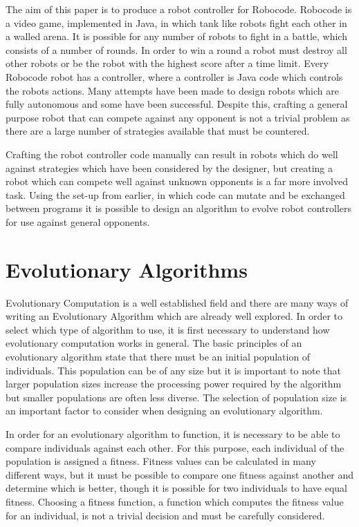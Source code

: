 \documentclass[a4paper, 12pt]{article}
\begin{document}
The aim of this paper is to produce a robot controller for Robocode. Robocode is a video game, implemented in Java, in which tank like robots fight each other in a walled arena. It is possible for any number of robots to fight in a battle, which consists of a number of rounds. In order to win a round a robot must destroy all other robots or be the robot with the highest score after a time limit. Every Robocode robot has a controller, where a controller is Java code which controls the robots actions. Many attempts have been made to design robots which are fully autonomous and some have been successful. Despite this, crafting a general purpose robot that can compete against any opponent is not a trivial problem as there are a large number of strategies available that must be countered.

Crafting the robot controller code manually can result in robots which do well against strategies which have been considered by the designer, but creating a robot which can compete well against unknown opponents is a far more involved task. Using the set-up from earlier, in which code can mutate and be exchanged between programs it is possible to design an algorithm to evolve robot controllers for use against general opponents. 

\section{Evolutionary Algorithms}

Evolutionary Computation is a well established field and there are many ways of writing an Evolutionary Algorithm which are already well explored. In order to select which type of algorithm to use, it is first necessary to understand how evolutionary computation works in general. The basic principles of an evolutionary algorithm state that there must be an initial population of individuals. This population can be of any size but it is important to note that larger population sizes increase the processing power required by the algorithm but smaller populations are often less diverse. The selection of population size is an important factor to consider when designing an evolutionary algorithm. 

In order for an evolutionary algorithm to function, it is necessary to be able to compare individuals against each other. For this purpose, each individual of the population is assigned a fitness. Fitness values can be calculated in many different ways, but it must be possible to compare one fitness against another and determine which is better, though it is possible for two individuals to have equal fitness. Choosing a fitness function, a function which computes the fitness value for an individual, is not a trivial decision and must be carefully considered.
\end{document}
